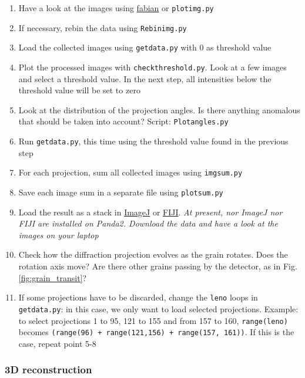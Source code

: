 \documentclass[11pt]{scrartcl}
\begin{document}
\begin{enumerate}
    \item Have a look at the images using \href{https://sourceforge.net/p/fable/wiki/fabian/}{fabian} or {\texttt{plot\textunderscore img.py}}
    \item If necessary, rebin the data using {\texttt{Rebin\textunderscore img.py}}
    \item Load the collected images using {\texttt{getdata.py}} with 0 as threshold value
    \item Plot the processed images with {\texttt{check\textunderscore threshold.py}}. Look at a few images and select a threshold value. In the next step, all intensities below the threshold value will be set to zero
    \item Look at the distribution of the projection angles. Is there anything anomalous that should be taken into account? Script: {\texttt{Plot\textunderscore angles.py}}
    \item Run {\texttt{getdata.py}}, this time using the threshold value found in the previous step
    \item For each projection, sum all collected images using {\texttt{img\textunderscore sum.py}}
    \item Save each image sum in a separate file using {\texttt{plot\textunderscore sum.py}}
    \item Load the result as a stack in \href{https://imagej.nih.gov/ij/}{ImageJ} or \href{https://imagej.net/Fiji}{\footnotesize{FIJI}}. {\emph{At present, nor ImageJ nor {\footnotesize{FIJI}} are installed on Panda2. Download the data and have a look at the images on your laptop}}
    \item Check how the diffraction projection evolves as the grain rotates. Does the rotation axis move? Are there other grains passing by the detector, as in Fig. \ref{fig:grain_transit}? 
    \item If some projections have to be discarded, change the {\texttt{leno}} loops in {\texttt{getdata.py}}: in this case, we only want to load selected projections. Example: to select projections 1 to 95, 121 to 155 and from 157 to 160, {\texttt{range(leno)}} becomes {\texttt{(range(96) + range(121,156) + range(157, 161))}}. If this is the case, repeat point 5-8
\end{enumerate}
   
\subsubsection{3D reconstruction}    
    
\end{document}
